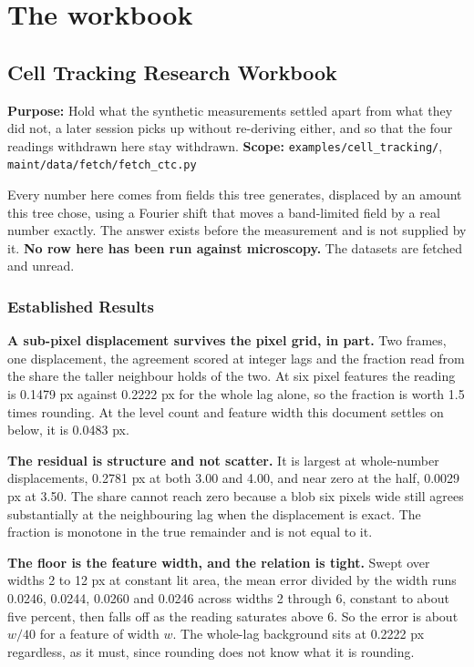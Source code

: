 \chapter{The workbook}

\section{Cell Tracking Research Workbook}

\textbf{Purpose:} Hold what the synthetic measurements settled apart from what they did not, a
later session picks up without re-deriving either, and so that the four readings withdrawn here stay
withdrawn. \textbf{Scope:} \texttt{examples/\allowbreak{}cell\_\allowbreak{}tracking/\allowbreak{}},
\texttt{maint/\allowbreak{}data/\allowbreak{}fetch/\allowbreak{}fetch\_\allowbreak{}ctc.\allowbreak{}py}

Every number here comes from fields this tree generates, displaced by an amount this tree chose,
using a Fourier shift that moves a band-limited field by a real number exactly. The answer exists
before the measurement and is not supplied by it. \textbf{No row here has been run against
microscopy.} The datasets are fetched and unread.

\subsection{Established Results}

\textbf{A sub-pixel displacement survives the pixel grid, in part.} Two frames, one displacement,
the agreement scored at integer lags and the fraction read from the share the taller neighbour holds
of the two. At six pixel features the reading is 0.1479 px against 0.2222 px for the whole lag
alone, so the fraction is worth 1.5 times rounding. At the level count and feature width this
document settles on below, it is 0.0483 px.

\textbf{The residual is structure and not scatter.} It is largest at whole-number displacements,
0.2781 px at both 3.00 and 4.00, and near zero at the half, 0.0029 px at 3.50. The share cannot
reach zero because a blob six pixels wide still agrees substantially at the neighbouring lag when
the displacement is exact. The fraction is monotone in the true remainder and is not equal to it.

\textbf{The floor is the feature width, and the relation is tight.} Swept over widths 2 to 12 px at
constant lit area, the mean error divided by the width runs 0.0246, 0.0244, 0.0260 and 0.0246 across
widths 2 through 6, constant to about five percent, then falls off as the reading saturates above 6.
So the error is about $w/40$ for a feature of width $w$. The whole-lag background sits at 0.2222 px
regardless, as it must, since rounding does not know what it is rounding.

